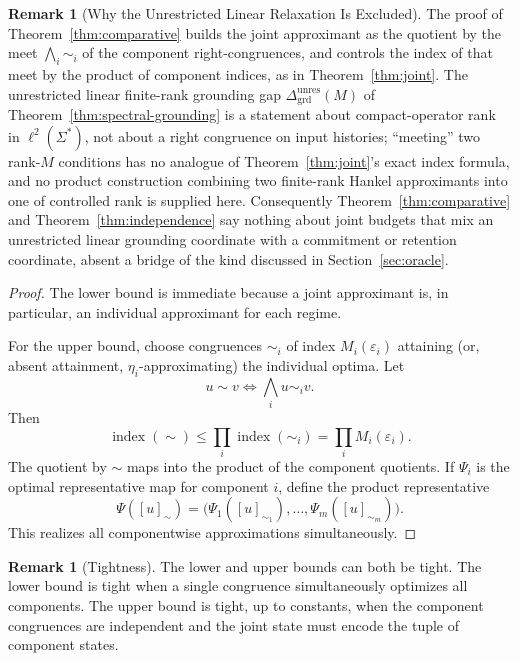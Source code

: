 \documentclass[12pt]{article}
\theoremstyle{definition}
\newtheorem{remark}[theorem]{Remark}
\newcommand{\Dunres}{\Delta_{\mathrm{grd}}^{\mathrm{unres}}}
\begin{document}
\begin{remark}[Why the Unrestricted Linear Relaxation Is Excluded]
\label{rem:comparative-grounding-excluded}
The proof of Theorem~\ref{thm:comparative} builds the joint approximant as
the quotient by the meet $\bigwedge_i\sim_i$ of the component
right-congruences, and controls the index of that meet by the product of
component indices, as in Theorem~\ref{thm:joint}.  The unrestricted linear
finite-rank grounding gap $\Dunres(M)$ of
Theorem~\ref{thm:spectral-grounding} is a statement about compact-operator
rank in $\ell^2(\Sigma^*)$, not about a right congruence on input histories;
``meeting'' two rank-$M$ conditions has no analogue of
Theorem~\ref{thm:joint}'s exact index formula, and no product construction
combining two finite-rank Hankel approximants into one of controlled rank is
supplied here.  Consequently Theorem~\ref{thm:comparative} and
Theorem~\ref{thm:independence} say nothing about joint budgets that mix an
unrestricted linear grounding coordinate with a commitment or retention
coordinate, absent a bridge of the kind discussed in
Section~\ref{sec:oracle}.
\end{remark}

\begin{proof}
The lower bound is immediate because a joint approximant is, in particular, an
individual approximant for each regime.

For the upper bound, choose congruences $\sim_i$ of index
$M_i(\varepsilon_i)$ attaining (or, absent attainment, $\eta_i$-approximating)
the individual optima.  Let
\[
u\sim v
\iff
\bigwedge_i u\sim_i v.
\]
Then
\[
\operatorname{index}(\sim)
\le
\prod_i\operatorname{index}(\sim_i)
=
\prod_i M_i(\varepsilon_i).
\]
The quotient by $\sim$ maps into the product of the component quotients.  If
$\Psi_i$ is the optimal representative map for component $i$, define the
product representative
\[
\Psi([u]_\sim)
=
\bigl(
\Psi_1([u]_{\sim_1}),
\dots,
\Psi_m([u]_{\sim_m})
\bigr).
\]
This realizes all componentwise approximations simultaneously.
\end{proof}

\begin{remark}[Tightness]
\label{rem:comparative-tightness}
The lower and upper bounds can both be tight.  The lower bound is tight when a
single congruence simultaneously optimizes all components.  The upper bound is
tight, up to constants, when the component congruences are independent and the
joint state must encode the tuple of component states.
\end{remark}
\end{document}
